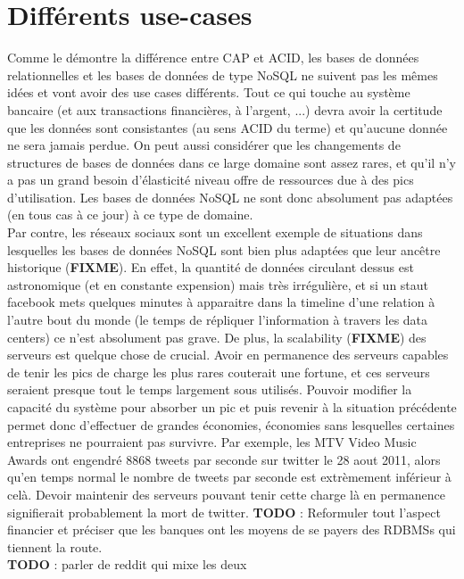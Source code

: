 \documentclass[11pt]{article}
\begin{document}
\section{Différents use-cases}
Comme le démontre la différence entre CAP et ACID, les bases de données relationnelles et les bases de données de type NoSQL ne suivent pas les mêmes idées et vont avoir des use cases différents. Tout ce qui touche au système bancaire (et aux transactions financières, à l'argent, ...) devra avoir la certitude que les données sont consistantes (au sens ACID du terme) et qu'aucune donnée ne sera jamais perdue. On peut aussi considérer que les changements de structures de bases de données dans ce large domaine sont assez rares, et qu'il n'y a pas un grand besoin d'élasticité niveau offre de ressources due à des pics d'utilisation. Les bases de données NoSQL ne sont donc absolument pas adaptées (en tous cas à ce jour) à ce type de domaine. \\
Par contre, les réseaux sociaux sont un excellent exemple de situations dans lesquelles les bases de données NoSQL sont bien plus adaptées que leur ancêtre historique (\textbf{FIXME}). En effet, la quantité de données circulant dessus est astronomique (et en constante expension) mais très irrégulière, et si un staut facebook mets quelques minutes à apparaitre dans la timeline d'une relation à l'autre bout du monde (le temps de répliquer l'information à travers les data centers) ce n'est absolument pas grave. De plus, la scalability (\textbf{FIXME}) des serveurs est quelque chose de crucial. Avoir en permanence des serveurs capables de tenir les pics de charge les plus rares couterait une fortune, et ces serveurs seraient presque tout le temps largement sous utilisés. Pouvoir modifier la capacité du système pour absorber un pic et puis revenir à la situation précédente permet donc d'effectuer de grandes économies, économies sans lesquelles certaines entreprises ne pourraient pas survivre. Par exemple, les MTV Video Music Awards ont engendré 8868 tweets par seconde sur twitter le 28 aout 2011, alors qu'en temps normal le nombre de tweets par seconde est extrèmement inférieur à celà. Devoir maintenir des serveurs pouvant tenir cette charge là en permanence signifierait probablement la mort de twitter. \textbf{TODO} : Reformuler tout l'aspect financier et préciser que les banques ont les moyens de se payers des RDBMSs qui tiennent la route. \\
\textbf{TODO} : parler de reddit qui mixe les deux
\end{document}
